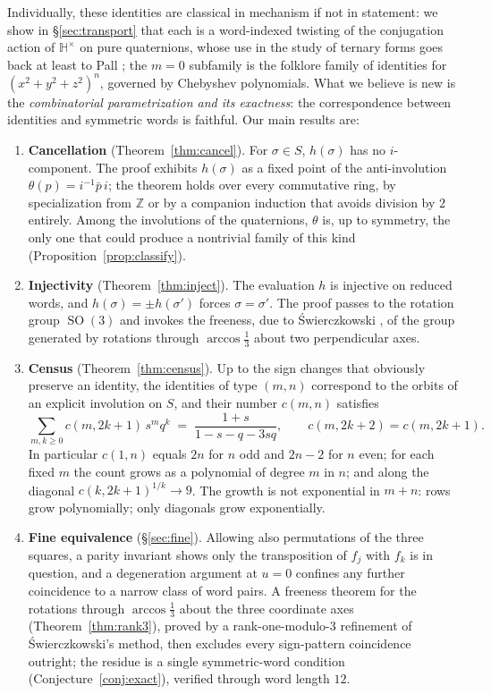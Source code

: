 \documentclass[11pt]{article}
\theoremstyle{definition}
\theoremstyle{remark}
\newcommand{\HH}{\mathbb{H}}
\newcommand{\ZZ}{\mathbb{Z}}
\DeclareMathOperator{\SO}{SO}
\begin{document}
Individually, these identities are classical in mechanism if not in statement: we show in \S\ref{sec:transport} that each is a word-indexed twisting of the conjugation action of $\HH^\times$ on pure quaternions, whose use in the study of ternary forms goes back at least to Pall \cite{Pall}; the $m=0$ subfamily is the folklore family of identities for $(x^2+y^2+z^2)^n$, governed by Chebyshev polynomials. What we believe is new is the \emph{combinatorial parametrization and its exactness}: the correspondence between identities and symmetric words is faithful. Our main results are:

\begin{enumerate}
\item[(i)] \textbf{Cancellation} (Theorem~\ref{thm:cancel}). For $\sigma\in S$, $h(\sigma)$ has no $i$-component. The proof exhibits $h(\sigma)$ as a fixed point of the anti-involution $\theta(p)=i^{-1}\bar p\, i$; the theorem holds over every commutative ring, by specialization from $\ZZ$ or by a companion induction that avoids division by $2$ entirely. Among the involutions of the quaternions, $\theta$ is, up to symmetry, the only one that could produce a nontrivial family of this kind (Proposition~\ref{prop:classify}).
\item[(ii)] \textbf{Injectivity} (Theorem~\ref{thm:inject}). The evaluation $h$ is injective on reduced words, and $h(\sigma)=\pm h(\sigma')$ forces $\sigma=\sigma'$. The proof passes to the rotation group $\SO(3)$ and invokes the freeness, due to Świerczkowski \cite{Swierczkowski}, of the group generated by rotations through $\arccos\frac13$ about two perpendicular axes.
\item[(iii)] \textbf{Census} (Theorem~\ref{thm:census}). Up to the sign changes that obviously preserve an identity, the identities of type $(m,n)$ correspond to the orbits of an explicit involution on $S$, and their number $c(m,n)$ satisfies
\[
\sum_{m,k\ge 0} c(m,2k+1)\, s^m q^k \;=\;\frac{1+s}{1-s-q-3sq},\qquad c(m,2k+2)=c(m,2k+1).
\]
In particular $c(1,n)$ equals $2n$ for $n$ odd and $2n-2$ for $n$ even; for each fixed $m$ the count grows as a polynomial of degree $m$ in $n$; and along the diagonal $c(k,2k+1)^{1/k}\to 9$. The growth is not exponential in $m+n$: rows grow polynomially; only diagonals grow exponentially.
\item[(iv)] \textbf{Fine equivalence} (\S\ref{sec:fine}). Allowing also permutations of the three squares, a parity invariant shows only the transposition of $f_j$ with $f_k$ is in question, and a degeneration argument at $u=0$ confines any further coincidence to a narrow class of word pairs. A freeness theorem for the rotations through $\arccos\frac13$ about the three coordinate axes (Theorem~\ref{thm:rank3}), proved by a rank-one-modulo-$3$ refinement of Świerczkowski's method, then excludes every sign-pattern coincidence outright; the residue is a single symmetric-word condition (Conjecture~\ref{conj:exact}), verified through word length $12$.
\end{enumerate}
\end{document}
